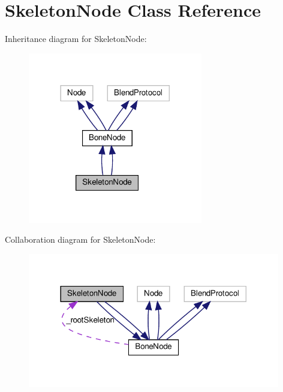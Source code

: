 \hypertarget{classSkeletonNode}{}\section{Skeleton\+Node Class Reference}
\label{classSkeletonNode}


Inheritance diagram for Skeleton\+Node\+:
\nopagebreak
\begin{figure}[H]
\begin{center}
\leavevmode
\includegraphics[width=216pt]{classSkeletonNode__inherit__graph}
\end{center}
\end{figure}


Collaboration diagram for Skeleton\+Node\+:
\nopagebreak
\begin{figure}[H]
\begin{center}
\leavevmode
\includegraphics[width=312pt]{classSkeletonNode__coll__graph}
\end{center}
\end{figure}
